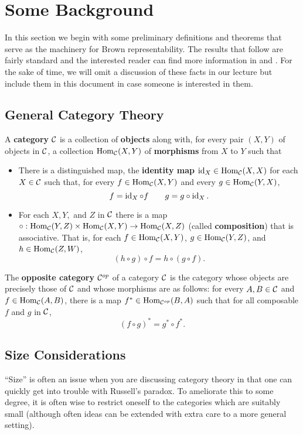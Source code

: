 \documentclass[12pt]{article}
\begin{document}
\section{Some Background}
In this section we begin with some preliminary definitions and theorems that serve as the machinery for Brown representability. 
The results that follow are fairly standard and the interested reader can find more information in \cite{neeman-book} and \cite{riehl}.
For the sake of time, we will omit a discussion of these facts in our lecture but include them in this document in case someone is interested in them.
\subsection{General Category Theory}
\begin{defn}
  A \textbf{category} $\mathcal{C}$ is a collection of \textbf{objects} along with, for every pair $(X,Y)$ of objects in $\mathcal{C}$, a collection $\operatorname{Hom}_{\mathcal{C}}(X,Y)$ of \textbf{morphisms} from $X$ to $Y$ such that
  \begin{itemize}
    \item There is a distinguished map, the \textbf{identity map} $\operatorname{id}_X\in\operatorname{Hom}_{\mathcal{C}}(X,X)$ for each $X\in\mathcal{C}$ such that, for every $f\in\operatorname{Hom}_{\mathcal{C}}(X,Y)$ and every $g\in\operatorname{Hom}_{\mathcal{C}}(Y,X)$,
    \[f=\operatorname{id}_X\circ f\qquad g=g\circ\operatorname{id}_X.\]
    \item For each $X,Y,$ and $Z$ in $\mathcal{C}$ there is a map $\circ:\operatorname{Hom}_{\mathcal{C}}(Y,Z)\times\operatorname{Hom}_{\mathcal{C}}(X,Y)\to\operatorname{Hom}_{\mathcal{C}}(X,Z)$ (called \textbf{composition}) that is associative. That is, for each $f\in\operatorname{Hom}_{\mathcal{C}}(X,Y)$, $g\in\operatorname{Hom}_{\mathcal{C}}(Y,Z)$, and $h\in\operatorname{Hom}_{\mathcal{C}}(Z,W)$,
    \[(h\circ g)\circ f=h\circ(g\circ f).\]
  \end{itemize}
\end{defn}
\begin{defn}
	The \textbf{opposite category} $\mathcal{C}^{op}$ of a category $\mathcal{C}$ is the category whose objects are 
	precisely those of $\mathcal{C}$ and whose morphisms are as follows: for every $A,B\in\mathcal{C}$ and $f\in\operatorname{Hom}_{\mathcal{C}}(A,B)$,
	there is a map $f^\ast\in\operatorname{Hom}_{\mathcal{C}^{op}}(B,A)$ such that for all composable $f$ and $g$ in $\mathcal{C}$,
	\[(f\circ g)^\ast=g^\ast\circ f^\ast.\]
\end{defn}

\subsection{Size Considerations}
``Size'' is often an issue when you are discussing category theory in that one can quickly get into trouble with Russell's paradox.
To ameliorate this to some degree, it is often wise to restrict oneself to the categories which are suitably small (although often 
ideas can be extended with extra care to a more general setting).
\end{document}
